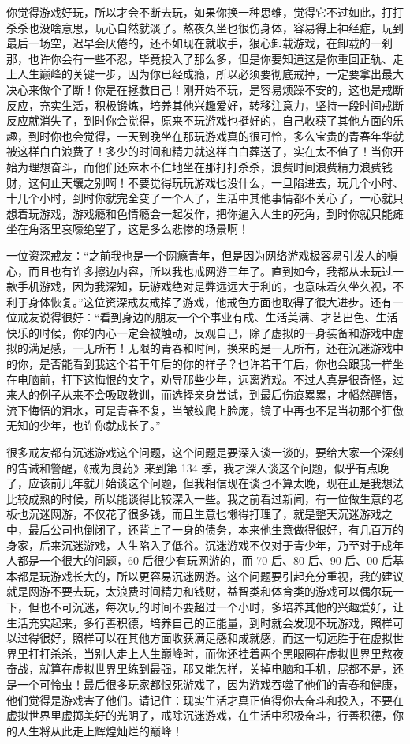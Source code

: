 你觉得游戏好玩，所以才会不断去玩，如果你换一种思维，觉得它不过如此，打打杀杀也没啥意思，玩心自然就淡了。熬夜久坐也很伤身体，容易得上神经症，玩到最后一场空，迟早会厌倦的，还不如现在就收手，狠心卸载游戏，在卸载的一刹那，也许你会有一些不忍，毕竟投入了那么多，但是你要知道这是你重回正轨、走上人生巅峰的关键一步，因为你已经成瘾，所以必须要彻底戒掉，一定要拿出最大决心来做个了断！你是在拯救自己！刚开始不玩，是容易烦躁不安的，这也是戒断反应，充实生活，积极锻炼，培养其他兴趣爱好，转移注意力，坚持一段时间戒断反应就消失了，到时你会觉得，原来不玩游戏也挺好的，自己收获了其他方面的乐趣，到时你也会觉得，一天到晚坐在那玩游戏真的很可怜，多么宝贵的青春年华就被这样白白浪费了！多少的时间和精力就这样白白葬送了，实在太不值了！当你开始为理想奋斗，而他们还麻木不仁地坐在那打打杀杀，浪费时间浪费精力浪费钱财，这何止天壤之别啊！不要觉得玩玩游戏也没什么，一旦陷进去，玩几个小时、十几个小时，到时你就完全变了一个人了，生活中其他事情都不关心了，一心就只想着玩游戏，游戏瘾和色情瘾会一起发作，把你逼入人生的死角，到时你就只能瘫坐在角落里哀嚎绝望了，这是多么悲惨的场景啊！

一位资深戒友：“之前我也是一个网瘾青年，但是因为网络游戏极容易引发人的嗔心，而且也有许多擦边内容，所以我也戒网游三年了。直到如今，我都从未玩过一款手机游戏，因为我深知，玩游戏绝对是弊远远大于利的，也意味着久坐久视，不利于身体恢复。”这位资深戒友戒掉了游戏，他戒色方面也取得了很大进步。还有一位戒友说得很好：“看到身边的朋友一个个事业有成、生活美满、才艺出色、生活快乐的时候，你的内心一定会被触动，反观自己，除了虚拟的一身装备和游戏中虚拟的满足感，一无所有！无限的青春和时间，换来的是一无所有，还在沉迷游戏中的你，是否能看到我这个若干年后的你的样子？也许若干年后，你也会跟我一样坐在电脑前，打下这悔恨的文字，劝导那些少年，远离游戏。不过人真是很奇怪，过来人的例子从来不会吸取教训，而选择亲身尝试，到最后伤痕累累，才幡然醒悟，流下悔悟的泪水，可是青春不复，当皱纹爬上脸庞，镜子中再也不是当初那个狂傲无知的少年，也许你就成长了。”

很多戒友都有沉迷游戏这个问题，这个问题是要深入谈一谈的，要给大家一个深刻的告诫和警醒，《戒为良药》来到第 134 季，我才深入谈这个问题，似乎有点晚了，应该前几年就开始谈这个问题，但我相信现在谈也不算太晚，现在正是我想法比较成熟的时候，所以能谈得比较深入一些。我之前看过新闻，有一位做生意的老板也沉迷网游，不仅花了很多钱，而且生意也懒得打理了，就是整天沉迷游戏之中，最后公司也倒闭了，还背上了一身的债务，本来他生意做得很好，有几百万的身家，后来沉迷游戏，人生陷入了低谷。沉迷游戏不仅对于青少年，乃至对于成年人都是一个很大的问题，60 后很少有玩网游的，而 70 后、80 后、90 后、00 后基本都是玩游戏长大的，所以更容易沉迷网游。这个问题要引起充分重视，我的建议就是网游不要去玩，太浪费时间精力和钱财，益智类和体育类的游戏可以偶尔玩一下，但也不可沉迷，每次玩的时间不要超过一个小时，多培养其他的兴趣爱好，让生活充实起来，多行善积德，培养自己的正能量，到时就会发现不玩游戏，照样可以过得很好，照样可以在其他方面收获满足感和成就感，而这一切远胜于在虚拟世界里打打杀杀，当别人走上人生巅峰时，而你还挂着两个黑眼圈在虚拟世界里熬夜奋战，就算在虚拟世界里练到最强，那又能怎样，关掉电脑和手机，屁都不是，还是一个可怜虫！最后很多玩家都恨死游戏了，因为游戏吞噬了他们的青春和健康，他们觉得是游戏害了他们。请记住：现实生活才真正值得你去奋斗和投入，不要在虚拟世界里虚掷美好的光阴了，戒除沉迷游戏，在生活中积极奋斗，行善积德，你的人生将从此走上辉煌灿烂的巅峰！

